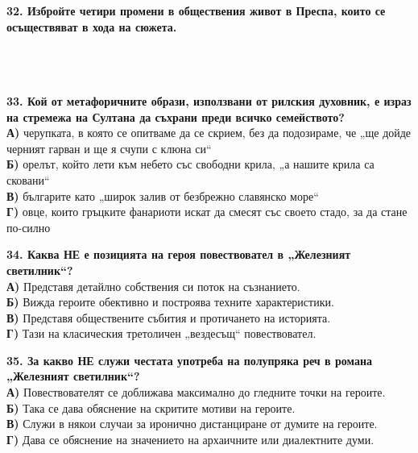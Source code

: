 \documentclass[12pt,a4paper]{article}
\begin{document}
\vspace{0.6cm}

\noindent
\textbf{32. Избройте четири промени в обществения живот в Преспа, които се осъществяват в хода на сюжета.} \\
\noindent
\makebox[\textwidth]{\dotfill} \\
\makebox[\textwidth]{\dotfill} \\
\makebox[\textwidth]{\dotfill} \\
\makebox[\textwidth]{\dotfill}

\vspace{0.6cm}

\noindent
\textbf{33. Кой от метафоричните образи, използвани от рилския духовник, е израз на стремежа на Султана да съхрани преди всичко семейството?} \\
\noindent
\textbf{А)} черупката, в която се опитваме да се скрием, без да подозираме, че „ще дойде черният гарван и ще я счупи с клюна си“ \\
\textbf{Б)} орелът, който лети към небето със свободни крила, „а нашите крила са сковани“ \\
\textbf{В)} българите като „широк залив от безбрежно славянско море“ \\
\textbf{Г)} овце, които гръцките фанариоти искат да смесят със своето стадо, за да стане по-силно

\vspace{0.6cm}

\noindent
\textbf{34. Каква НЕ е позицията на героя повествовател в „Железният светилник“?} \\
\noindent
\textbf{А)} Представя детайлно собствения си поток на съзнанието. \\
\textbf{Б)} Вижда героите обективно и построява техните характеристики. \\
\textbf{В)} Представя обществените събития и протичането на историята. \\
\textbf{Г)} Тази на класическия третоличен „вездесъщ“ повествовател.

\vspace{0.6cm}

\noindent
\textbf{35. За какво НЕ служи честата употреба на полупряка реч в романа „Железният светилник“?} \\
\noindent
\textbf{А)} Повествователят се доближава максимално до гледните точки на героите. \\
\textbf{Б)} Така се дава обяснение на скритите мотиви на героите. \\
\textbf{В)} Служи в някои случаи за иронично дистанциране от думите на героите. \\
\textbf{Г)} Дава се обяснение на значението на архаичните или диалектните думи.
\end{document}

